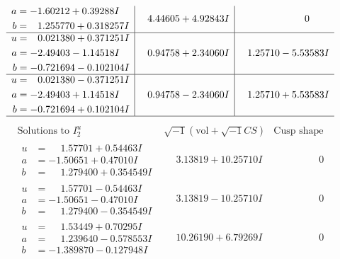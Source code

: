 \documentclass[1p]{elsarticle_modified}
\theoremstyle{definition}
\newcommand{\I}{\sqrt{-1}}
\begin{document}
$$\begin{array}{c|c|c}
\begin{aligned}
a &= -1.60212 + 0.39288 I \\
b &= \phantom{-}1.255770 + 0.318257 I\end{aligned}
 & \phantom{-}4.44605 + 4.92843 I & \phantom{-0.000000 } 0 \\ \hline\begin{aligned}
u &= \phantom{-}0.021380 + 0.371251 I \\
a &= -2.49403 - 1.14518 I \\
b &= -0.721694 - 0.102104 I\end{aligned}
 & \phantom{-}0.94758 + 2.34060 I & \phantom{-}1.25710 - 5.53583 I \\ \hline\begin{aligned}
u &= \phantom{-}0.021380 - 0.371251 I \\
a &= -2.49403 + 1.14518 I \\
b &= -0.721694 + 0.102104 I\end{aligned}
 & \phantom{-}0.94758 - 2.34060 I & \phantom{-}1.25710 + 5.53583 I\\
 \hline 
 \end{array}$$\newpage$$\begin{array}{c|c|c}  
\text{Solutions to }I^u_{2}& \I (\text{vol} + \sqrt{-1}CS) & \text{Cusp shape}\\
 \hline 
\begin{aligned}
u &= \phantom{-}1.57701 + 0.54463 I \\
a &= -1.50651 + 0.47010 I \\
b &= \phantom{-}1.279400 + 0.354549 I\end{aligned}
 & \phantom{-}3.13819 + 10.25710 I & \phantom{-0.000000 } 0 \\ \hline\begin{aligned}
u &= \phantom{-}1.57701 - 0.54463 I \\
a &= -1.50651 - 0.47010 I \\
b &= \phantom{-}1.279400 - 0.354549 I\end{aligned}
 & \phantom{-}3.13819 - 10.25710 I & \phantom{-0.000000 } 0 \\ \hline\begin{aligned}
u &= \phantom{-}1.53449 + 0.70295 I \\
a &= \phantom{-}1.239640 - 0.578553 I \\
b &= -1.389870 - 0.127948 I\end{aligned}
 & \phantom{-}10.26190 + 6.79269 I & \phantom{-0.000000 } 0 \\ \hline\begin{aligned}

\end{aligned}
\end{array}$$
\end{document}
